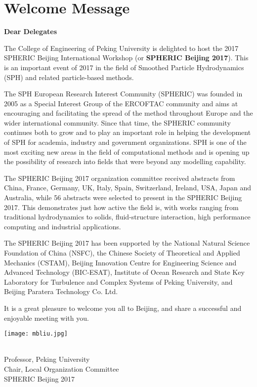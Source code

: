 \chapter*{Welcome Message}

\vspace{-5em}
\textbf{\Large Dear Delegates}\vspace{1em}

The College of Engineering of Peking University is delighted to host the 2017 SPHERIC Beijing International Workshop (or \textbf{SPHERIC Beijing 2017}). This is an important event of 2017 in the field of Smoothed Particle Hydrodynamics (SPH) and related particle-based methods.

The SPH European Research Interest Community (SPHERIC) was founded in 2005 as a Special Interest Group of the ERCOFTAC community and aims at encouraging and facilitating the spread of the method throughout Europe and the wider international community. Since that time, the SPHERIC community continues both to grow and to play an important role in helping the development of SPH for academia, industry and government organizations. SPH is one of the most exciting new areas in the field of computational methods and is opening up the possibility of research into fields that were beyond any modelling capability. 

The SPHERIC Beijing 2017 organization committee received abstracts from China, France, Germany, UK, Italy, Spain, Switzerland, Ireland, USA, Japan and Australia, while 56 abstracts were selected to present in the SPHERIC Beijing 2017. This demonstrates just how active the field is, with works ranging from traditional hydrodynamics to solids, fluid-structure interaction, high performance computing and industrial applications. 

The SPHERIC Beijing 2017 has been supported by the National Natural Science Foundation of China (NSFC), the Chinese Society of Theoretical and Applied Mechanics (CSTAM), Beijing Innovation Centre for Engineering Science and Advanced Technology (BIC-ESAT), Institute of Ocean Research and State Key Laboratory for Turbulence and Complex Systems of Peking University, and Beijing Paratera Technology Co. Ltd.  

It is a great pleasure to welcome you all to Beijing, and share a successful and enjoyable meeting with you.


\begin{flushright}
\texttt{[image: mbliu.jpg]}\\
\textbf{\MBLiu ~~~~~}\\
\vspace{1em}

Professor, Peking University\\
Chair, Local Organization Committee\\
SPHERIC Beijing 2017
\end{flushright}
